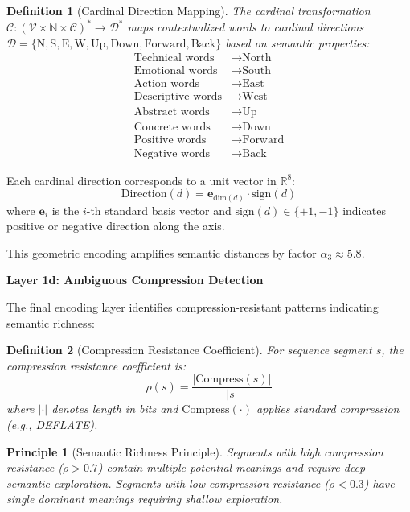 \documentclass[12pt,a4paper]{article}
\newtheorem{definition}{Definition}
\newtheorem{principle}{Principle}
\begin{document}
\begin{definition}[Cardinal Direction Mapping]
The cardinal transformation $\mathcal{C}: (\mathcal{V} \times \mathbb{N} \times \mathcal{C})^* \to \mathcal{D}^*$ maps contextualized words to cardinal directions $\mathcal{D} = \{\text{N}, \text{S}, \text{E}, \text{W}, \text{Up}, \text{Down}, \text{Forward}, \text{Back}\}$ based on semantic properties:
\begin{align}
\text{Technical words} &\to \text{North} \\
\text{Emotional words} &\to \text{South} \\
\text{Action words} &\to \text{East} \\
\text{Descriptive words} &\to \text{West} \\
\text{Abstract words} &\to \text{Up} \\
\text{Concrete words} &\to \text{Down} \\
\text{Positive words} &\to \text{Forward} \\
\text{Negative words} &\to \text{Back}
\end{align}
\end{definition}

Each cardinal direction corresponds to a unit vector in $\mathbb{R}^8$:
\begin{equation}
\text{Direction}(d) = \mathbf{e}_{\text{dim}(d)} \cdot \text{sign}(d)
\end{equation}
where $\mathbf{e}_i$ is the $i$-th standard basis vector and $\text{sign}(d) \in \{+1, -1\}$ indicates positive or negative direction along the axis.

This geometric encoding amplifies semantic distances by factor $\alpha_3 \approx 5.8$.

\textbf{Layer 1d: Ambiguous Compression Detection}

The final encoding layer identifies compression-resistant patterns indicating semantic richness:

\begin{definition}[Compression Resistance Coefficient]
For sequence segment $s$, the compression resistance coefficient is:
\begin{equation}
\rho(s) = \frac{|\text{Compress}(s)|}{|s|}
\end{equation}
where $|\cdot|$ denotes length in bits and $\text{Compress}(\cdot)$ applies standard compression (e.g., DEFLATE).
\end{definition}

\begin{principle}[Semantic Richness Principle]
Segments with high compression resistance ($\rho > 0.7$) contain multiple potential meanings and require deep semantic exploration. Segments with low compression resistance ($\rho < 0.3$) have single dominant meanings requiring shallow exploration.
\end{principle}
\end{document}
